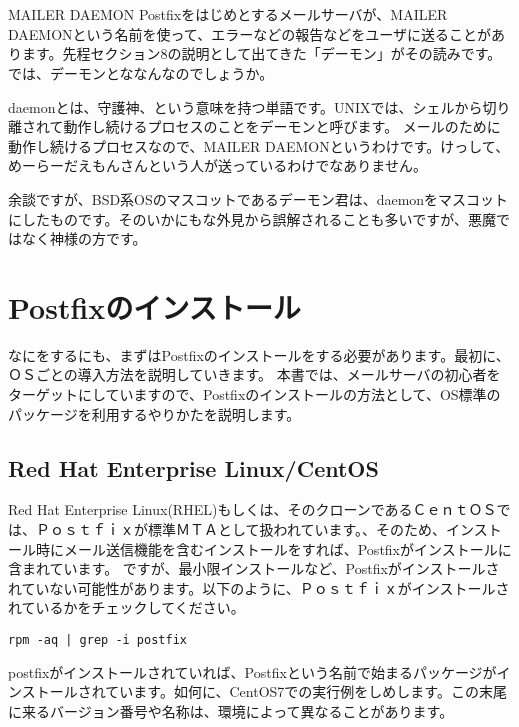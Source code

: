 \section*{}
\begin{itembox}[l]{MAILER DAEMON}
Postfixをはじめとするメールサーバが、MAILER DAEMONという名前を使って、エラーなどの報告などをユーザに送ることがあります。先程セクション8の説明として出てきた「デーモン」がその読みです。では、デーモンとななんなのでしょうか。

daemonとは、守護神、という意味を持つ単語です。UNIXでは、シェルから切り離されて動作し続けるプロセスのことをデーモンと呼びます。
メールのために動作し続けるプロセスなので、MAILER DAEMONというわけです。けっして、めーらーだえもんさんという人が送っているわけでなありません。

余談ですが、BSD系OSのマスコットであるデーモン君は、daemonをマスコットにしたものです。そのいかにもな外見から誤解されることも多いですが、悪魔ではなく神様の方です。

\end{itembox}

\section{Postfixのインストール}
なにをするにも、まずはPostfixのインストールをする必要があります。最初に、ＯＳごとの導入方法を説明していきます。
本書では、メールサーバの初心者をターゲットにしていますので、Postfixのインストールの方法として、OS標準のパッケージを利用するやりかたを説明します。

\subsection{Red Hat Enterprise Linux/CentOS}
Red Hat Enterprise Linux(RHEL)もしくは、そのクローンであるＣｅｎｔＯＳでは、Ｐｏｓｔｆｉｘが標準ＭＴＡとして扱われています。、そのため、インストール時にメール送信機能を含むインストールをすれば、Postfixがインストールに含まれています。
ですが、最小限インストールなど、Postfixがインストールされていない可能性があります。以下のように、Ｐｏｓｔｆｉｘがインストールされているかをチェックしてください。

\begin{lstlisting}[basicstyle=\ttfamily\footnotesize, frame=single]
rpm -aq | grep -i postfix
\end{lstlisting}

postfixがインストールされていれば、Postfixという名前で始まるパッケージがインストールされています。如何に、CentOS7での実行例をしめします。この末尾に来るバージョン番号や名称は、環境によって異なることがあります。

